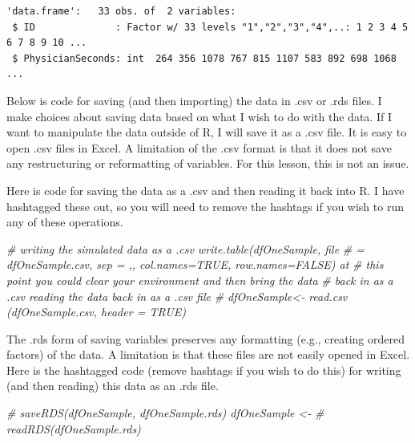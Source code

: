 \documentclass[
  11pt,
]{book}
\newenvironment{Shaded}{\begin{snugshade}}{\end{snugshade}}
\newcommand{\CommentTok}[1]{\textcolor[rgb]{0.56,0.35,0.01}{\textit{#1}}}
\begin{document}
\begin{verbatim}
'data.frame':   33 obs. of  2 variables:
 $ ID              : Factor w/ 33 levels "1","2","3","4",..: 1 2 3 4 5 6 7 8 9 10 ...
 $ PhysicianSeconds: int  264 356 1078 767 815 1107 583 892 698 1068 ...
\end{verbatim}

Below is code for saving (and then importing) the data in .csv or .rds files. I make choices about saving data based on what I wish to do with the data. If I want to manipulate the data outside of R, I will save it as a .csv file. It is easy to open .csv files in Excel. A limitation of the .csv format is that it does not save any restructuring or reformatting of variables. For this lesson, this is not an issue.

Here is code for saving the data as a .csv and then reading it back into R. I have hashtagged these out, so you will need to remove the hashtags if you wish to run any of these operations.

\begin{Shaded}
\begin{Highlighting}[]
\CommentTok{\# writing the simulated data as a .csv write.table(dfOneSample, file}
\CommentTok{\# = \textquotesingle{}dfOneSample.csv\textquotesingle{}, sep = \textquotesingle{},\textquotesingle{}, col.names=TRUE, row.names=FALSE) at}
\CommentTok{\# this point you could clear your environment and then bring the data}
\CommentTok{\# back in as a .csv reading the data back in as a .csv file}
\CommentTok{\# dfOneSample\textless{}{-} read.csv (\textquotesingle{}dfOneSample.csv\textquotesingle{}, header = TRUE)}
\end{Highlighting}
\end{Shaded}

The .rds form of saving variables preserves any formatting (e.g., creating ordered factors) of the data. A limitation is that these files are not easily opened in Excel. Here is the hashtagged code (remove hashtags if you wish to do this) for writing (and then reading) this data as an .rds file.

\begin{Shaded}
\begin{Highlighting}[]
\CommentTok{\# saveRDS(dfOneSample, \textquotesingle{}dfOneSample.rds\textquotesingle{}) dfOneSample \textless{}{-}}
\CommentTok{\# readRDS(\textquotesingle{}dfOneSample.rds\textquotesingle{})}
\end{Highlighting}
\end{Shaded}
\end{document}
